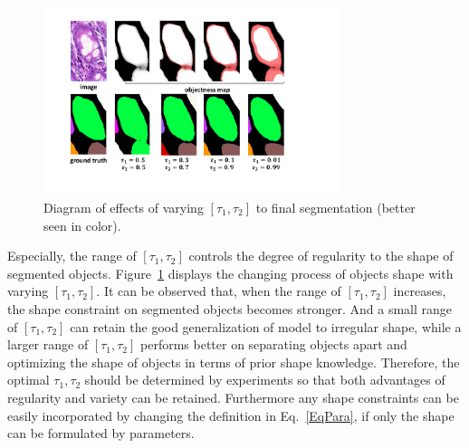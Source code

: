 \begin{figure}
    \begin{center}
        \includegraphics[width=3.4in]{figures/FigFusion.pdf}
    \end{center}
    \caption{Diagram of effects of varying $[\tau_1,\tau_2]$ to final segmentation (better seen in color).}
    \label{FigFusion}
\end{figure}
Especially, the range of $[\tau_1,\tau_2]$ controls the degree of regularity to the shape of segmented objects.
Figure~\ref{FigFusion} displays the changing process of objects shape with varying $[\tau_1,\tau_2]$.
It can be observed that, when the range of $[\tau_1,\tau_2]$ increases, the shape constraint on segmented objects becomes stronger.
And a small range of $[\tau_1,\tau_2]$ can retain the good generalization of model to irregular shape, while a larger range of $[\tau_1,\tau_2]$ performs better on separating objects apart and optimizing the shape of objects in terms of prior shape knowledge.
Therefore, the optimal $\tau_1, \tau_2$ should be determined by experiments so that both advantages of regularity and variety can be retained.
Furthermore any shape constraints can be easily incorporated by changing the definition in Eq.~\ref{EqPara}, if only the shape can be formulated by parameters.

